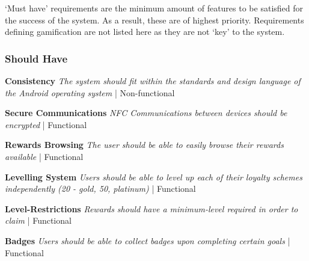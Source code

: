 `Must have' requirements are the minimum amount of features to be satisfied for the success of the system. As a result, these are of highest priority. Requirements defining gamification are not listed here as they are not `key' to the system.

\subsubsection{Should Have}
\begin{description}[leftmargin=!,labelwidth=\widthof{\bfseries Medium}]
    \item[S1] \textbf{Consistency} \newline
        \textit{The system should fit within the standards and design language of the Android operating system}  | Non-functional
        
    \item[S2] \textbf{Secure Communications} \newline
        \textit{NFC Communications between devices should be encrypted}  | Functional

    \item[S3] \textbf{Rewards Browsing} \newline
        \textit{The user should be able to easily browse their rewards available}  | Functional
        
    \item[S4] \textbf{Levelling System} \newline
        \textit{Users should be able to level up each of their loyalty schemes independently (20 - gold, 50, platinum)}  | Functional
        
    \item[S5] \textbf{Level-Restrictions} \newline
        \textit{Rewards should have a minimum-level required in order to claim}  | Functional

    \item[S6] \textbf{Badges} \newline
        \textit{Users should be able to collect badges upon completing certain goals}  | Functional
\end{description}

